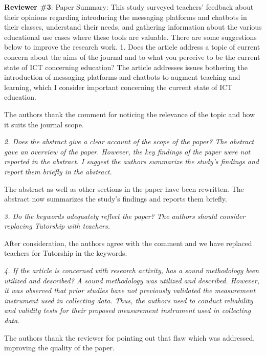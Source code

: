 \documentclass{letter}
\begin{document}
\newpage


{\it

{\bf Reviewer \#3}: Paper Summary:
This study surveyed teachers' feedback about their opinions regarding introducing the messaging platforms and chatbots in their classes, understand their needs, and gathering information about the various educational use cases where these tools are valuable. There are some suggestions below to improve the research work.
1.      Does the article address a topic of current concern about the aims of the journal and to what you perceive to be the current state of ICT concerning education? The article addresses issues bothering the introduction of messaging platforms and chatbots to augment teaching and learning, which I consider important concerning the current state of ICT education.}


The authors thank the comment for noticing the relevance of the topic and how it suits the journal scope.

{\it 2.      Does the abstract give a clear account of the scope of the paper? The abstract gave an overview of the paper. However, the key findings of the paper were not reported in the abstract. I suggest the authors summarize the study's findings and report them briefly in the abstract.}


The abstract as well as other sections in the paper have been rewritten. The abstract now summarizes the study's findings and reports them briefly.


{\it 3.      Do the keywords adequately reflect the paper? The authors should consider replacing Tutorship with teachers.}

After consideration, the authors agree with the comment and we have replaced teachers for Tutorship in the keywords.


{\it 4.      If the article is concerned with research activity, has a sound methodology been utilized and described? A sound methodology was utilized and described. However, it was observed that prior studies have not previously validated the measurement instrument used in collecting data. Thus, the authors need to conduct reliability and validity tests for their proposed measurement instrument used in collecting data.}

The authors thank the reviewer for pointing out that flaw which was addressed, improving the quality of the paper.
\end{document}
